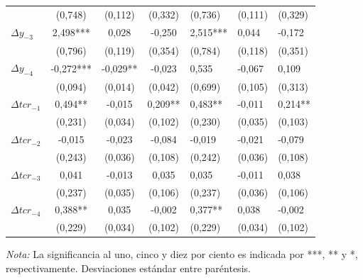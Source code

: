 \documentclass[12pt,letterpaper]{article}
\begin{document}
\begin{table}
\begin{center}
{\begin{tabular}{lccc}
							& (0,748)			& (0,112)			& (0,332)			& (0,736)			& (0,111)			& (0,329)			\\
$\Delta y_{-3}$		& 2,498***		& 0,028			& -0,250			& 2,515***		& 0,044			& -0,172			\\
							& (0,796)			& (0,119)			& (0,354)			& (0,784)			& (0,118)			& (0,351)			\\
$\Delta y_{-4}$		& -0,272***		& -0,029**		& -0,023			& 0,535			& -0,067			& 0,109				\\
							& (0,094)			& (0,014)			& (0,042)			& (0,699)			& (0,105)			& (0,313)			\\
$\Delta tcr_{-1}$	& 0,494**			& -0,015			& 0,209**			& 0,483**			& -0,011			& 0,214**			\\
							& (0,231)			& (0,034)			& (0,102)			& (0,230)			& (0,035)			& (0,103)			\\
$\Delta tcr_{-2}$	& -0,015			& -0,023			& -0,084			& -0,019			& -0,021			& -0,079			\\
							& (0,243)			& (0,036)			& (0,108)			& (0,242)			& (0,036)			& (0,108)			\\
$\Delta tcr_{-3}$	& 0,041				& -0,013			& 0,035			& 0,035			& -0,011			& 0,038			\\
							& (0,237)			& (0,035)			& (0,106)			& (0,237)			& (0,036)			& (0,106)			\\
$\Delta tcr_{-4}$	& 0,388**			& 0,035			& -0,002			& 0,377**			& 0,038			& -0,002			\\
							& (0,229)			& (0,034)			& (0,102)			& (0,229)			& (0,034)			& (0,102)			\\
\hline									
\hline									
\end{tabular}%
}
\end{center}
\begin{scriptsize}
\emph{Nota:} La significancia al uno, cinco y diez por ciento es indicada por ***, ** y *, respectivamente. Desviaciones estándar entre paréntesis.
\end{scriptsize}								
\label{cointm}	
\end{table}	
\end{document}

